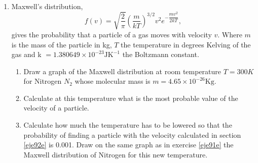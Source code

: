 \begin{enumerate}
\item Maxwell's distribution, 
\begin{equation}
f(v) = \sqrt{\frac{2}{\pi}}\left( \frac{m}{kT}\right)^{3/2}v^2e^{-\dfrac{\scriptstyle mv^2}{\scriptstyle 2kT}},
\end{equation}
gives the probability that a particle of a gas moves with velocity $v$. Where $m$ is the mass of the particle in kg, $T$ the temperature in degrees Kelving of the gas and k $=1.380649\times 10^{-23} \text{JK}^{-1}$ the Boltzmann constant. 
\begin{enumerate}
\item  \label{eje91e}Draw a graph of the Maxwell distribution at room temperature  $T= 300K$ for Nitrogen $N_2$ whose molecular mass is $m = 4.65 \times 10^{-26}	\text{Kg}$.
\item \label{eje92e}Calculate at this temperature what is the most probable value of the velocity of a particle.
\item Calculate how much the temperature has to be lowered so that the probability of finding a particle with the velocity calculated in section \ref{eje92e} is 0.001. Draw on the same graph as in exercise \ref{eje91e} the Maxwell distribution of Nitrogen for this new temperature. 

\end{enumerate}

\end{enumerate}    


